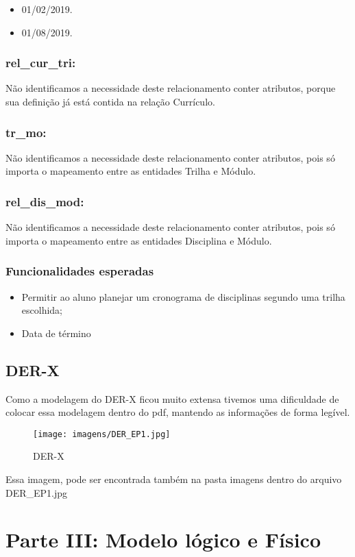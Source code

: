 \documentclass{report}
\begin{document}
\begin{itemize}
  \item 01/02/2019.
  \item 01/08/2019.
\end{itemize}
\subsection{rel\_cur\_tri:}
 Não identificamos a necessidade deste relacionamento conter atributos, porque
 sua definição já está contida na relação Currículo.
\subsection{tr\_mo:}
 Não identificamos a necessidade deste relacionamento conter atributos, pois só
 importa o mapeamento entre as entidades Trilha e Módulo.
\subsection{rel\_dis\_mod:}
 Não identificamos a necessidade deste relacionamento conter atributos, pois só
 importa o mapeamento entre as entidades Disciplina e Módulo.
\subsection{Funcionalidades esperadas}
\begin{itemize}
  \item Permitir ao aluno planejar um cronograma de disciplinas segundo uma trilha
escolhida;
  \item Data de término
\end{itemize}


\break

\section {DER-X}
Como a modelagem do DER-X ficou muito extensa tivemos uma dificuldade de colocar essa modelagem dentro do pdf, mantendo as informações de forma legível.

\begin{figure}[!htb]
     \centering
     \texttt{[image: imagens/DER\_EP1.jpg]}
     \caption{DER-X}
\end{figure}

Essa imagem, pode ser encontrada também na pasta imagens dentro do arquivo DER\_EP1.jpg


\chapter{Parte III: Modelo lógico e Físico}
\end{document}
